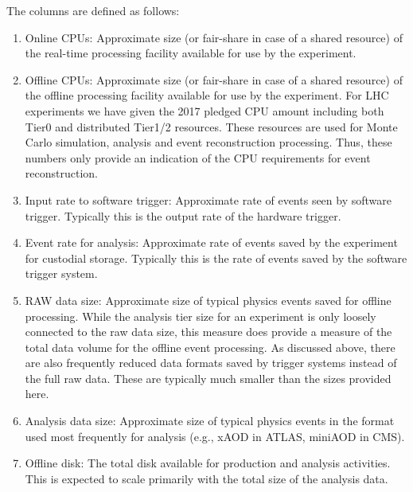 The columns are defined as follows:
\begin{enumerate}
\item Online CPUs: Approximate size (or fair-share in case of a shared resource) of the real-time processing facility available for use by the experiment.
\item Offline CPUs: Approximate size (or fair-share in case of a shared resource) of the offline processing facility available for use by the experiment. For LHC experiments we have given the 2017 pledged CPU amount including both Tier0 and distributed Tier1/2 resources. These resources are used for Monte Carlo simulation, analysis and event reconstruction processing. Thus, these numbers only provide an indication of the CPU requirements for event reconstruction.
\item Input rate to software trigger: Approximate rate of events seen by software trigger. Typically this is the output rate of the hardware trigger.
\item Event rate for analysis: Approximate rate of events saved by the experiment for custodial storage. Typically this is the rate of events saved by the software trigger system.
\item RAW data size: Approximate size of typical physics events saved for offline processing. While the analysis tier size for an experiment is only loosely connected to the raw data size, this measure does provide a measure of the total data volume for the offline event processing. As discussed above, there are also frequently reduced data formats saved by trigger systems instead of the full raw data. These are typically much smaller than the sizes provided here.
\item Analysis data size: Approximate size of typical physics events in the format used most frequently for analysis (e.g., xAOD in ATLAS, miniAOD in CMS).
\item Offline disk: The total disk available for production and analysis activities. This is expected to scale primarily with the total size of the analysis data.
\end{enumerate}

